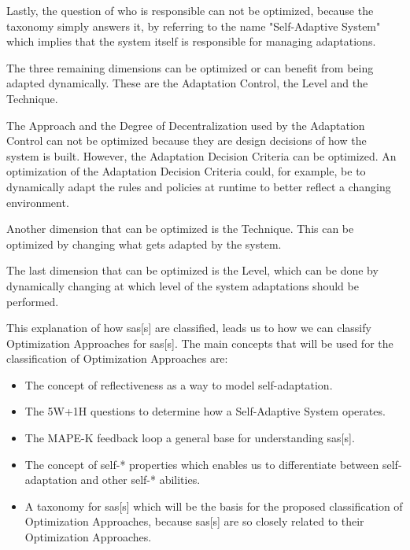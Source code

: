 \noindent Lastly, the question of who is responsible can not be optimized, because the taxonomy simply answers it,
by referring to the name "Self-Adaptive System" which implies that the system itself is responsible for managing adaptations.

\noindent The three remaining dimensions can be optimized or can benefit from being adapted dynamically.
These are the Adaptation Control, the Level and the Technique.

\noindent The Approach and the Degree of Decentralization used by the Adaptation Control can not be optimized 
because they are design decisions of how the system is built.
However, the Adaptation Decision Criteria can be optimized. An optimization of the Adaptation Decision Criteria
could, for example, be to dynamically adapt the rules and policies at runtime to better reflect a changing environment.

\noindent Another dimension that can be optimized is the Technique. 
This can be optimized by changing what gets adapted by the system.

\noindent The last dimension that can be optimized is the Level, which can be done by dynamically changing at which level of the system
adaptations should be performed.

\noindent This explanation of how \acrlong{sas}[s] are classified,
leads us to how we can classify Optimization Approaches for \acrlong{sas}[s].
The main concepts that will be used for the classification of Optimization Approaches are:
\begin{itemize}[nosep]
    \item The concept of reflectiveness as a way to model self-adaptation.
    \item The 5W+1H questions to determine how a Self-Adaptive System operates.
    \item The MAPE-K feedback loop a general base for understanding \acrlong{sas}[s].
    \item The concept of self-* properties which enables us to differentiate between self-adaptation
    and other self-* abilities.
    \item A taxonomy for \acrlong{sas}[s] which will be the basis for the proposed classification of Optimization Approaches,
    because \acrlong{sas}[s] are so closely related to their Optimization Approaches.
\end{itemize}